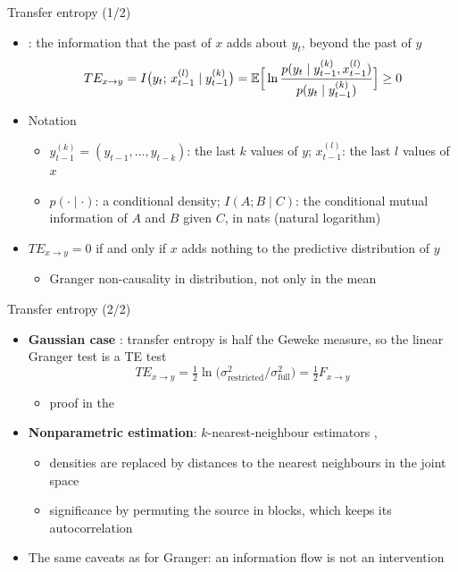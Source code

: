 \begin{frame}{Transfer entropy (1/2)}
\itemsize{\small}
\begin{itemize}
    \item {}: the information that the past of $x$ adds about $y_t$, beyond the past of $y$ \[ TE_{x\to y} = I\big(y_t;\, x_{t-1}^{(l)} \mid y_{t-1}^{(k)}\big) = \mathbb{E}\Big[\ln\dfrac{p(y_t\mid y^{(k)}_{t-1}, x^{(l)}_{t-1})}{p(y_t\mid y^{(k)}_{t-1})}\Big] \ge 0 \]
    \item Notation
    \begin{itemize}
        \item $y^{(k)}_{t-1} = (y_{t-1}, \dots, y_{t-k})$: the last $k$ values of $y$; $x^{(l)}_{t-1}$: the last $l$ values of $x$
        \item $p(\cdot\mid\cdot)$: a conditional density; $I(A; B\mid C)$: the conditional mutual information of $A$ and $B$ given $C$, in nats (natural logarithm)
    \end{itemize}
    \item $TE_{x\to y} = 0$ if and only if $x$ adds nothing to the predictive distribution of $y$
    \begin{itemize}
        \item Granger non-causality in distribution, not only in the mean
    \end{itemize}
\end{itemize}
\end{frame}

\begin{frame}{Transfer entropy (2/2)}
\itemsize{\small}
\begin{itemize}
    \item \textbf{Gaussian case} : transfer entropy is half the Geweke measure, so the linear Granger test is a TE test \[ TE_{x\to y} = \tfrac12\ln\big(\sigma^2_{\mathrm{restricted}}/\sigma^2_{\mathrm{full}}\big) = \tfrac12 F_{x\to y} \]
    \begin{itemize}
        \item proof in the 
    \end{itemize}
    \item \textbf{Nonparametric estimation}: $k$-nearest-neighbour estimators , 
    \begin{itemize}
        \item densities are replaced by distances to the nearest neighbours in the joint space
        \item significance by permuting the source in blocks, which keeps its autocorrelation
    \end{itemize}
    \item The same caveats as for Granger: an information flow is not an intervention
\end{itemize}
\end{frame}

